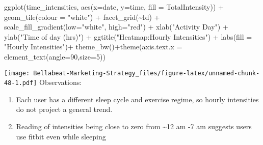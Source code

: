 \documentclass[
]{article}
\newenvironment{Shaded}{\begin{snugshade}}{\end{snugshade}}
\newcommand{\AttributeTok}[1]{\textcolor[rgb]{0.77,0.63,0.00}{#1}}
\newcommand{\DecValTok}[1]{\textcolor[rgb]{0.00,0.00,0.81}{#1}}
\newcommand{\FunctionTok}[1]{\textcolor[rgb]{0.00,0.00,0.00}{#1}}
\newcommand{\NormalTok}[1]{#1}
\newcommand{\SpecialCharTok}[1]{\textcolor[rgb]{0.00,0.00,0.00}{#1}}
\newcommand{\StringTok}[1]{\textcolor[rgb]{0.31,0.60,0.02}{#1}}
\providecommand{\tightlist}{%
  \setlength{\itemsep}{0pt}\setlength{\parskip}{0pt}}
\begin{document}
\begin{Shaded}
\begin{Highlighting}[]
\FunctionTok{ggplot}\NormalTok{(time\_intensities, }\FunctionTok{aes}\NormalTok{(}\AttributeTok{x=}\NormalTok{date, }\AttributeTok{y=}\NormalTok{time, }\AttributeTok{fill =}\NormalTok{ TotalIntensity)) }\SpecialCharTok{+} 
  \FunctionTok{geom\_tile}\NormalTok{(}\AttributeTok{colour =} \StringTok{"white"}\NormalTok{) }\SpecialCharTok{+} \FunctionTok{facet\_grid}\NormalTok{(}\SpecialCharTok{\textasciitilde{}}\NormalTok{Id) }\SpecialCharTok{+} \FunctionTok{scale\_fill\_gradient}\NormalTok{(}\AttributeTok{low=}\StringTok{"white"}\NormalTok{, }\AttributeTok{high=}\StringTok{"red"}\NormalTok{) }\SpecialCharTok{+}  \FunctionTok{xlab}\NormalTok{(}\StringTok{"Activity Day"}\NormalTok{) }\SpecialCharTok{+} \FunctionTok{ylab}\NormalTok{(}\StringTok{"Time of day (hrs)"}\NormalTok{) }\SpecialCharTok{+} \FunctionTok{ggtitle}\NormalTok{(}\StringTok{"Heatmap:Hourly Intensities"}\NormalTok{) }\SpecialCharTok{+} \FunctionTok{labs}\NormalTok{(}\AttributeTok{fill =} \StringTok{"Hourly Intensities"}\NormalTok{)}\SpecialCharTok{+}
  \FunctionTok{theme\_bw}\NormalTok{()}\SpecialCharTok{+}\FunctionTok{theme}\NormalTok{(}\AttributeTok{axis.text.x =} \FunctionTok{element\_text}\NormalTok{(}\AttributeTok{angle=}\DecValTok{90}\NormalTok{,}\AttributeTok{size=}\DecValTok{5}\NormalTok{))}
\end{Highlighting}
\end{Shaded}

\texttt{[image: Bellabeat-Marketing-Strategy\_files/figure-latex/unnamed-chunk-48-1.pdf]}
Observations:

\begin{enumerate}
\def\labelenumi{\arabic{enumi}.}
\tightlist
\item
  Each user has a different sleep cycle and exercise regime, so hourly
  intensities do not project a general trend.
\item
  Reading of intensities being close to zero from \textasciitilde12 am
  -7 am suggests users use fitbit even while sleeping
\end{enumerate}
\end{document}
